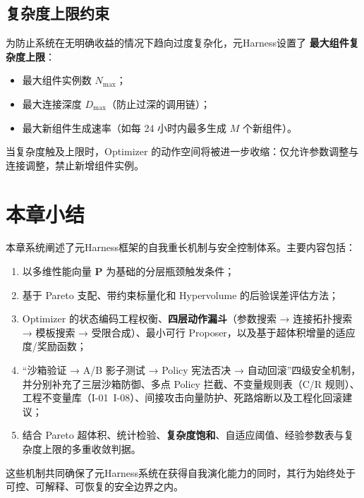 \subsection{复杂度上限约束}

为防止系统在无明确收益的情况下趋向过度复杂化，元Harness设置了 \textbf{最大组件复杂度上限}：
\begin{itemize}
    \item 最大组件实例数 $N_{\max}$；
    \item 最大连接深度 $D_{\max}$（防止过深的调用链）；
    \item 最大新组件生成速率（如每 24 小时内最多生成 $M$ 个新组件）。
\end{itemize}

当复杂度触及上限时，Optimizer 的动作空间将被进一步收缩：仅允许参数调整与连接调整，禁止新增组件实例。

\section{本章小结}

本章系统阐述了元Harness框架的自我重长机制与安全控制体系。主要内容包括：
\begin{enumerate}
    \item 以多维性能向量 $\mathbf{P}$ 为基础的分层瓶颈触发条件；
    \item 基于 Pareto 支配、带约束标量化和 Hypervolume 的后验误差评估方法；
    \item Optimizer 的状态编码工程权衡、\textbf{四层动作漏斗}（参数搜索 → 连接拓扑搜索 → 模板搜索 → 受限合成）、最小可行 Proposer，以及基于超体积增量的适应度/奖励函数；
    \item “沙箱验证 → A/B 影子测试 → Policy 宪法否决 → 自动回滚”四级安全机制，并分别补充了三层沙箱防御、多点 Policy 拦截、不变量规则表（C/R 规则）、工程不变量库（I-01~I-08）、间接攻击向量防护、死路熔断以及工程化回滚建议；
    \item 结合 Pareto 超体积、统计检验、\textbf{复杂度饱和}、自适应阈值、经验参数表与复杂度上限的多重收敛判据。
\end{enumerate}

这些机制共同确保了元Harness系统在获得自我演化能力的同时，其行为始终处于可控、可解释、可恢复的安全边界之内。
